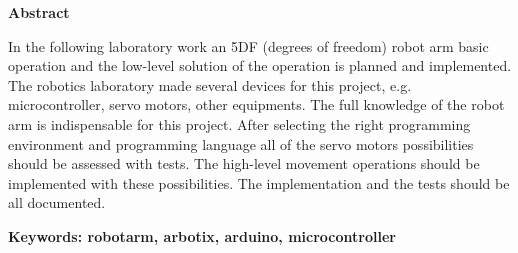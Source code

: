 \thispagestyle{empty}

\begin{center}
	\Large
	\textbf{Abstract}
\end{center}
\vspace{5pt}

	\hspace{15pt}In the following laboratory work an 5DF (degrees of freedom) robot arm basic operation and the low-level solution of the operation is planned and implemented. The robotics laboratory made several devices for this project, e.g. microcontroller, servo motors, other equipments. The full knowledge of the robot arm is indispensable for this project. After selecting the right programming environment and programming language all of the servo motors possibilities should be assessed with tests. The high-level movement operations should be implemented with these possibilities. The implementation and the tests should be all documented.

\textbf{Keywords: robotarm, arbotix, arduino, microcontroller} \textit{}
	
\newpage